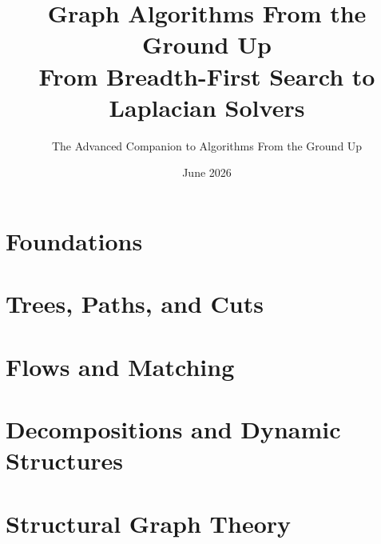 \documentclass[11pt]{book}
\title{\textbf{Graph Algorithms From the Ground Up}\\[0.4em]\large From Breadth-First Search to Laplacian Solvers}
\author{The Advanced Companion to Algorithms From the Ground Up}
\date{June 2026}
\begin{document}
\frontmatter
\maketitle

\tableofcontents

\mainmatter

\part{Foundations}






\part{Trees, Paths, and Cuts}







\part{Flows and Matching}








\part{Decompositions and Dynamic Structures}








\part{Structural Graph Theory}





\end{document}
